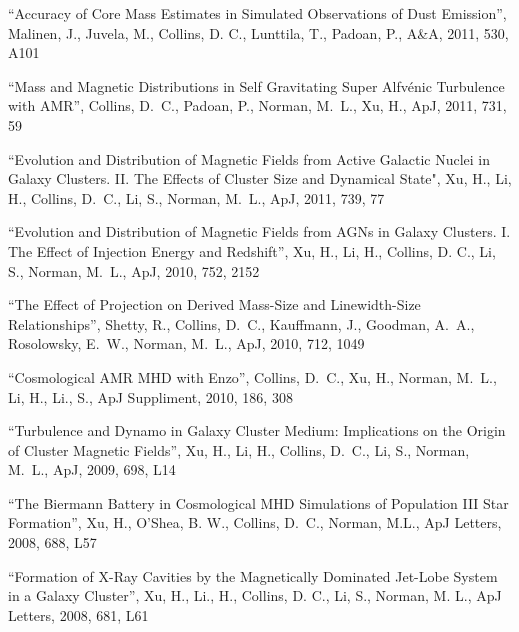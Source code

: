 \medskip
\noindent
``Accuracy of Core Mass Estimates in Simulated Observations of Dust Emission'', 
Malinen, J., Juvela, M., Collins, D. C., Lunttila, T., Padoan, P.,
A\&A, 2011, 530, A101

\medskip
\noindent
``Mass and Magnetic Distributions in Self Gravitating Super Alfv\' enic Turbulence with AMR'', 
Collins, D.~C., Padoan, P., Norman, M.~L., Xu, H.,
ApJ, 2011, 731, 59

\medskip
\noindent
``Evolution and Distribution of Magnetic Fields from Active Galactic Nuclei in Galaxy Clusters. II. The Effects of Cluster Size and Dynamical State",
Xu, H., Li, H., Collins, D.~C., Li, S., Norman, M.~L.,
ApJ, 2011, 739, 77

\medskip
\noindent
``Evolution and Distribution of Magnetic Fields from AGNs in Galaxy Clusters.  I.  The Effect of Injection Energy and Redshift'', 
Xu, H., Li, H., Collins, D. C., Li, S., Norman, M.~L.,
ApJ, 2010, 752, 2152

\medskip
\noindent
``The Effect of Projection on Derived Mass-Size and Linewidth-Size Relationships'', 
Shetty, R., Collins, D.~C.,  Kauffmann, J.,  Goodman, A.~A.,  Rosolowsky, E.~W.,  Norman, M.~L., 
ApJ, 2010, 712, 1049

\medskip
\noindent
``Cosmological AMR MHD with Enzo'', 
Collins, D.~C., Xu, H., Norman, M.~L., Li, H., Li., S.,
ApJ Suppliment, 2010, 186, 308

\medskip
\noindent
``Turbulence and Dynamo in Galaxy Cluster Medium: Implications on the Origin of Cluster Magnetic Fields'',
Xu, H., Li, H., Collins, D.~C., Li, S., Norman, M.~L.,
ApJ, 2009, 698, L14

\medskip
\noindent
``The Biermann Battery in Cosmological MHD Simulations of Population III Star Formation'',
Xu, H., O'Shea, B. W., Collins, D.~C., Norman, M.L.,
ApJ Letters, 2008, 688, L57  

\medskip
\noindent
``Formation of X-Ray Cavities by the Magnetically Dominated Jet-Lobe System in a Galaxy Cluster'',
Xu, H., Li., H., Collins, D. C., Li, S., Norman, M. L.,
ApJ Letters, 2008, 681, L61 
